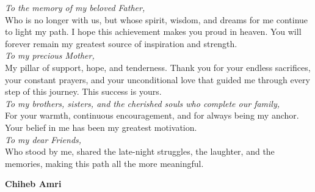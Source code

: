 \vspace{0.8cm}
\begin{flushleft}
    \large
    \textit{To the memory of my beloved Father,}\\
    Who is no longer with us, but whose spirit, wisdom, and dreams for me continue to light my path. I hope this achievement makes you proud in heaven. You will forever remain my greatest source of inspiration and strength.\\
    \vspace{0.5cm}
    \textit{To my precious Mother,}\\
    My pillar of support, hope, and tenderness. Thank you for your endless sacrifices, your constant prayers, and your unconditional love that guided me through every step of this journey. This success is yours.\\
    \vspace{0.5cm}
    \textit{To my brothers, sisters, and the cherished souls who complete our family,}\\
    For your warmth, continuous encouragement, and for always being my anchor. Your belief in me has been my greatest motivation.\\
    \vspace{0.5cm}
    \textit{To my dear Friends,}\\
    Who stood by me, shared the late-night struggles, the laughter, and the memories, making this path all the more meaningful.\\
\end{flushleft}

\vspace{1.5cm}
\begin{flushleft}
    \textbf{Chiheb Amri}
\end{flushleft}

\newpage
